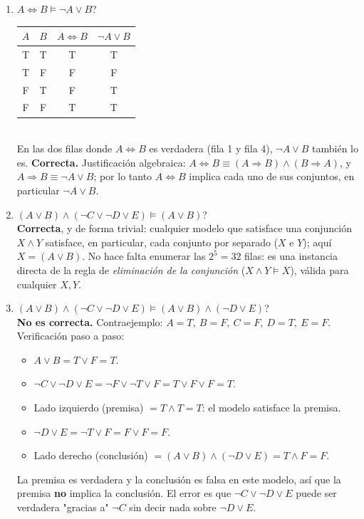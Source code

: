 \begin{enumerate}
    \item $A \Leftrightarrow B \models \neg A \lor B$?\\
    \begin{tabular}{cccc}
        \toprule
        $A$ & $B$ & $A\Leftrightarrow B$ & $\neg A \lor B$ \\
        \midrule
        T & T & T & T \\
        T & F & F & F \\
        F & T & F & T \\
        F & F & T & T \\
        \bottomrule
    \end{tabular}\\
    En las dos filas donde $A\Leftrightarrow B$ es verdadera (fila 1 y fila 4), $\neg A \lor B$
    también lo es. \textbf{Correcta.} Justificación algebraica: $A\Leftrightarrow B \equiv (A
    \Rightarrow B)\land(B\Rightarrow A)$, y $A\Rightarrow B \equiv \neg A \lor B$; por lo tanto
    $A\Leftrightarrow B$ implica cada uno de sus conjuntos, en particular $\neg A \lor B$.

    \item $(A \lor B) \land (\neg C \lor \neg D \lor E) \models (A \lor B)$?\\
    \textbf{Correcta}, y de forma trivial: cualquier modelo que satisface una conjunción $X \land Y$
    satisface, en particular, cada conjunto por separado ($X$ e $Y$); aquí $X = (A\lor B)$. No hace
    falta enumerar las $2^5=32$ filas: es una instancia directa de la regla de \textit{eliminación de
    la conjunción} ($X \land Y \models X$), válida para cualquier $X, Y$.

    \item $(A \lor B) \land (\neg C \lor \neg D \lor E) \models (A \lor B) \land (\neg D \lor E)$?\\
    \textbf{No es correcta.} Contraejemplo: $A=T,\ B=F,\ C=F,\ D=T,\ E=F$.\\
    Verificación paso a paso:
    \begin{itemize}
        \item $A \lor B = T \lor F = T$.
        \item $\neg C \lor \neg D \lor E = \neg F \lor \neg T \lor F = T \lor F \lor F = T$.
        \item Lado izquierdo (premisa) $= T \land T = T$: el modelo satisface la premisa.
        \item $\neg D \lor E = \neg T \lor F = F \lor F = F$.
        \item Lado derecho (conclusión) $= (A\lor B) \land (\neg D \lor E) = T \land F = F$.
    \end{itemize}
    La premisa es verdadera y la conclusión es falsa en este modelo, así que la premisa \textbf{no}
    implica la conclusión. El error es que $\neg C \lor \neg D \lor E$ puede ser verdadera "gracias a"
    $\neg C$ sin decir nada sobre $\neg D \lor E$.
\end{enumerate}


